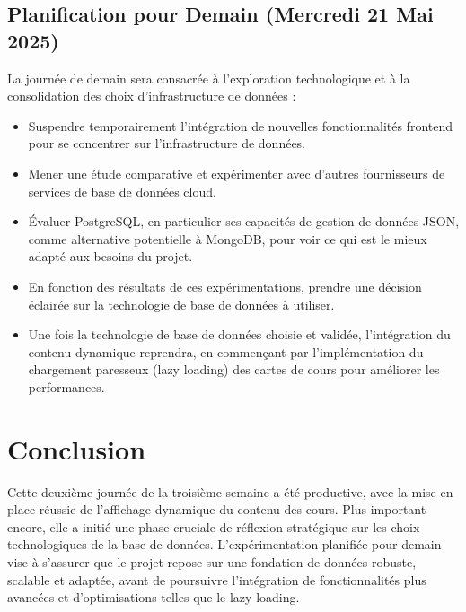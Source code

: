 \documentclass[12pt, a4paper]{article}
\begin{document}
\subsection{Planification pour Demain (Mercredi 21 Mai 2025)} %
La journée de demain sera consacrée à l'exploration technologique et à la consolidation des choix d'infrastructure de données :
\begin{itemize}
  \item Suspendre temporairement l'intégration de nouvelles fonctionnalités frontend pour se concentrer sur l'infrastructure de données.
  \item Mener une étude comparative et expérimenter avec d'autres fournisseurs de services de base de données cloud.
  \item Évaluer PostgreSQL, en particulier ses capacités de gestion de données JSON, comme alternative potentielle à MongoDB, pour voir ce qui est le mieux adapté aux besoins du projet.
  \item En fonction des résultats de ces expérimentations, prendre une décision éclairée sur la technologie de base de données à utiliser.
  \item Une fois la technologie de base de données choisie et validée, l'intégration du contenu dynamique reprendra, en commençant par l'implémentation du chargement paresseux (lazy loading) des cartes de cours pour améliorer les performances.
\end{itemize}

\section{Conclusion}
Cette deuxième journée de la troisième semaine a été productive, avec la mise en place réussie de l'affichage dynamique du contenu des cours. Plus important encore, elle a initié une phase cruciale de réflexion stratégique sur les choix technologiques de la base de données. L'expérimentation planifiée pour demain vise à s'assurer que le projet repose sur une fondation de données robuste, scalable et adaptée, avant de poursuivre l'intégration de fonctionnalités plus avancées et d'optimisations telles que le lazy loading.
\end{document}
